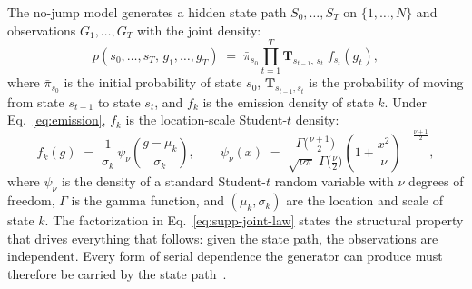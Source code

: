 The no-jump model generates a hidden state path $S_0, \dots, S_T$ on
$\{1, \dots, N\}$ and observations $G_1, \dots, G_T$ with the joint
density:
\begin{equation}
  p(s_0, \dots, s_T,\, g_1, \dots, g_T)
  \;=\; \bar\pi_{s_0} \prod_{t=1}^{T}
  \mathbf{T}_{s_{t-1},\, s_t}\; f_{s_t}(g_t),
  \label{eq:supp-joint-law}
\end{equation}
where $\bar\pi_{s_0}$ is the initial probability of state $s_0$,
$\mathbf{T}_{s_{t-1}, s_t}$ is the probability of moving from state
$s_{t-1}$ to state $s_t$, and $f_k$ is the emission density of state
$k$. Under Eq.~\eqref{eq:emission}, $f_k$ is the location-scale
Student-$t$ density:
\begin{equation}
  f_k(g) \;=\; \frac{1}{\sigma_k}\,
  \psi_\nu\!\left(\frac{g - \mu_k}{\sigma_k}\right),
  \qquad
  \psi_\nu(x) \;=\;
  \frac{\Gamma\!\big(\tfrac{\nu+1}{2}\big)}
       {\sqrt{\nu \pi}\; \Gamma\!\big(\tfrac{\nu}{2}\big)}
  \left(1 + \frac{x^2}{\nu}\right)^{\!-\frac{\nu+1}{2}},
  \label{eq:supp-emission-density}
\end{equation}
where $\psi_\nu$ is the density of a standard Student-$t$ random
variable with $\nu$ degrees of freedom, $\Gamma$ is the gamma
function, and $(\mu_k, \sigma_k)$ are the location and scale of state
$k$. The factorization in Eq.~\eqref{eq:supp-joint-law} states the
structural property that drives everything that follows: given the
state path, the observations are independent. Every form of serial
dependence the generator can produce must therefore be carried by the
state path~\cite{rabinerJuang1986}.

